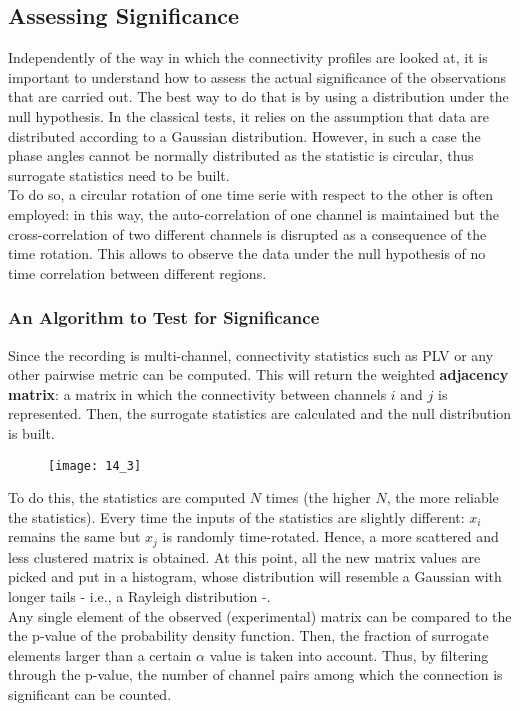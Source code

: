 \subsection{Assessing Significance}
Independently of the way in which the connectivity profiles are looked at, it is important to understand
how to assess the actual significance of the observations that are carried out. The best way to do that
is by using a distribution under the null hypothesis. In the classical tests, it relies on the
assumption that data are distributed according to a Gaussian distribution. However, in such a case the
phase angles cannot be normally distributed as the statistic is circular, thus surrogate statistics need
to be built.\\
To do so, a circular rotation of one time serie with respect to the other is often employed: in this way,
the auto-correlation of one channel is maintained but the cross-correlation of two different channels is
disrupted as a consequence of the time rotation. This allows to observe the data under the null
hypothesis of no time correlation between different regions.
\subsubsection{An Algorithm to Test for Significance}
Since the recording is multi-channel, connectivity statistics such as PLV or any other pairwise metric
can be computed. This will return the weighted \textbf{adjacency matrix}: a matrix in which the
connectivity between channels \(i\) and \(j\) is represented. Then, the surrogate statistics are calculated
and the null distribution is built.
\begin{figure}[H]
    \centering
    \texttt{[image: 14\_3]}
\end{figure}
To do this, the statistics are computed \(N\) times (the higher \(N\), the more reliable the statistics).
Every time the inputs of the statistics are slightly different: \(x_i\) remains the same but \(x_j\) is
randomly time-rotated. Hence, a more scattered and less clustered matrix is obtained. At this point, all
the new matrix values are picked and put in a histogram, whose distribution will resemble a Gaussian with
longer tails - i.e., a Rayleigh distribution -.\\
Any single element of the observed (experimental) matrix can be compared to the the p-value of the
probability density function. Then, the fraction of surrogate elements larger than a certain \(\alpha\)
value is taken into account. Thus, by filtering through the p-value, the number of channel pairs among
which the connection is significant can be counted.
